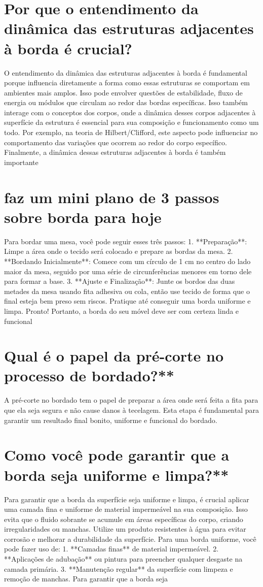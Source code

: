\documentclass[11pt,a4paper]{article}
\begin{document}
\section{Por que o entendimento da dinâmica das estruturas adjacentes à borda é crucial?}
O entendimento da dinâmica das estruturas adjacentes à borda é fundamental porque influencia diretamente a forma como essas estruturas se comportam em ambientes mais amplos. Isso pode envolver questões de estabilidade, fluxo de energia ou módulos que circulam ao redor das bordas específicas. Isso também interage com o conceptos dos corpos, onde a dinâmica desses corpos adjacentes à superfície da estrutura é essencial para sua composição e funcionamento como um todo. Por exemplo, na teoria de Hilbert/Clifford, este aspecto pode influenciar no comportamento das variações que ocorrem ao redor do corpo específico. Finalmente, a dinâmica dessas estruturas adjacentes à borda é também importante

\section{faz um mini plano de 3 passos sobre borda para hoje}
Para bordar uma mesa, você pode seguir esses três passos: 1. **Preparação**: Limpe a área onde o tecido será colocado e prepare as bordas da mesa. 2. **Bordando Inicialmente**: Comece com um círculo de 1 cm no centro do lado maior da mesa, seguido por uma série de circunferências menores em torno dele para formar a base. 3. **Ajuste e Finalização**: Junte os bordos das duas metades da mesa usando fita adhesiva ou cola, então use tecido de forma que o final esteja bem preso sem riscos. Pratique até conseguir uma borda uniforme e limpa. Pronto! Portanto, a borda do seu móvel deve ser com certeza linda e funcional

\section{Qual é o papel da pré-corte no processo de bordado?**}
A pré-corte no bordado tem o papel de preparar a área onde será feita a fita para que ela seja segura e não cause danos à tecelagem. Esta etapa é fundamental para garantir um resultado final bonito, uniforme e funcional do bordado.

\section{Como você pode garantir que a borda seja uniforme e limpa?**}
Para garantir que a borda da superfície seja uniforme e limpa, é crucial aplicar uma camada fina e uniforme de material impermeável na sua composição. Isso evita que o fluido sobrante se acumule em áreas específicas do corpo, criando irregularidades ou manchas. Utilize um produto resistentes à água para evitar corrosão e melhorar a durabilidade da superfície. Para uma borda uniforme, você pode fazer uso de: 1. **Camadas finas** de material impermeável. 2. **Aplicações de adubação** ou pintura para preencher qualquer desgaste na camada primária. 3. **Manutenção regular** da superfície com limpeza e remoção de manchas. Para garantir que a borda seja
\end{document}
